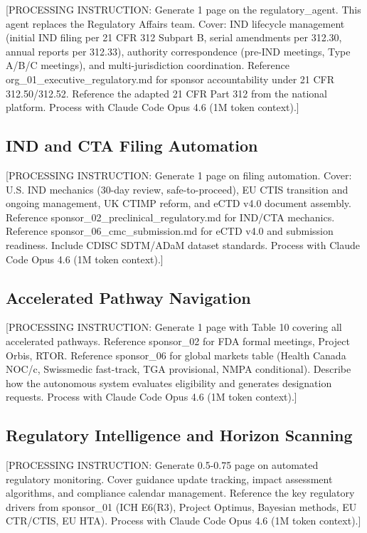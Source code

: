 [PROCESSING INSTRUCTION: Generate 1 page on the regulatory\_agent. This agent replaces
the Regulatory Affairs team. Cover: IND lifecycle management (initial IND filing per
21 CFR 312 Subpart B, serial amendments per 312.30, annual reports per 312.33),
authority correspondence (pre-IND meetings, Type A/B/C meetings), and multi-jurisdiction
coordination. Reference org\_01\_executive\_regulatory.md for sponsor accountability
under 21 CFR 312.50/312.52. Reference the adapted 21 CFR Part 312 from the
national platform. Process with Claude Code Opus 4.6 (1M token context).]

\subsection{IND and CTA Filing Automation}

[PROCESSING INSTRUCTION: Generate 1 page on filing automation. Cover: U.S. IND mechanics
(30-day review, safe-to-proceed), EU CTIS transition and ongoing management, UK CTIMP
reform, and eCTD v4.0 document assembly. Reference sponsor\_02\_preclinical\_regulatory.md
for IND/CTA mechanics. Reference sponsor\_06\_cmc\_submission.md for eCTD v4.0 and
submission readiness. Include CDISC SDTM/ADaM dataset standards.
Process with Claude Code Opus 4.6 (1M token context).]

\subsection{Accelerated Pathway Navigation}

[PROCESSING INSTRUCTION: Generate 1 page with Table 10 covering all accelerated pathways.
Reference sponsor\_02 for FDA formal meetings, Project Orbis, RTOR. Reference sponsor\_06
for global markets table (Health Canada NOC/c, Swissmedic fast-track, TGA provisional,
NMPA conditional). Describe how the autonomous system evaluates eligibility and
generates designation requests. Process with Claude Code Opus 4.6 (1M token context).]

\subsection{Regulatory Intelligence and Horizon Scanning}

[PROCESSING INSTRUCTION: Generate 0.5-0.75 page on automated regulatory monitoring.
Cover guidance update tracking, impact assessment algorithms, and compliance calendar
management. Reference the key regulatory drivers from sponsor\_01 (ICH E6(R3),
Project Optimus, Bayesian methods, EU CTR/CTIS, EU HTA).
Process with Claude Code Opus 4.6 (1M token context).]
